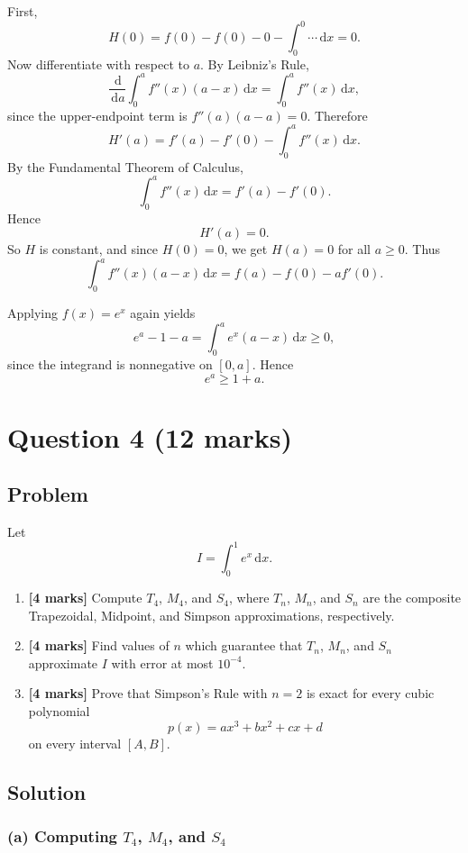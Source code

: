 \documentclass[12pt]{article}
\newcommand{\dd}{\,\mathrm{d}}
\begin{document}
First,
\[
H(0)=f(0)-f(0)-0-\int_0^0 \cdots \dd x=0.
\]
Now differentiate with respect to \(a\). By Leibniz's Rule,
\[
\frac{\dd}{\dd a}\int_0^a f''(x)(a-x)\dd x
=
\int_0^a f''(x)\dd x,
\]
since the upper-endpoint term is \(f''(a)(a-a)=0\). Therefore
\[
H'(a)=f'(a)-f'(0)-\int_0^a f''(x)\dd x.
\]
By the Fundamental Theorem of Calculus,
\[
\int_0^a f''(x)\dd x=f'(a)-f'(0).
\]
Hence
\[
H'(a)=0.
\]
So \(H\) is constant, and since \(H(0)=0\), we get \(H(a)=0\) for all \(a\ge 0\). Thus
\[
\boxed{\int_0^a f''(x)(a-x)\dd x=f(a)-f(0)-af'(0).}
\]

Applying \(f(x)=e^x\) again yields
\[
e^a-1-a=\int_0^a e^x(a-x)\dd x\ge 0,
\]
since the integrand is nonnegative on \([0,a]\). Hence
\[
\boxed{e^a\ge 1+a.}
\]

\newpage

\section{Question 4 \hfill (12 marks)}

\subsection{Problem}

Let
\[
I=\int_0^1 e^x\dd x.
\]

\begin{enumerate}[label=(\alph*)]
\item \textbf{[4 marks]} Compute \(T_4\), \(M_4\), and \(S_4\), where \(T_n\), \(M_n\), and \(S_n\) are the composite Trapezoidal, Midpoint, and Simpson approximations, respectively.

\item \textbf{[4 marks]} Find values of \(n\) which guarantee that \(T_n\), \(M_n\), and \(S_n\) approximate \(I\) with error at most \(10^{-4}\).

\item \textbf{[4 marks]} Prove that Simpson's Rule with \(n=2\) is exact for every cubic polynomial
\[
p(x)=ax^3+bx^2+cx+d
\]
on every interval \([A,B]\).
\end{enumerate}

\subsection{Solution}

\subsubsection{(a) Computing \(T_4\), \(M_4\), and \(S_4\)}
\end{document}
